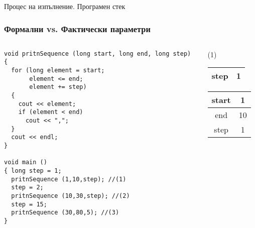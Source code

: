 \documentclass{beamer}
\begin{document}
\begin{frame}
\centerline{Процес на изпълнение. Програмен стек}
\end{frame}


\begin{frame}[fragile]
\frametitle{Формални vs. Фактически параметри}



\begin{columns}[t]
  \begin{column}{0.75\textwidth}

\begin{lstlisting}
void pritnSequence (long start, long end, long step)
{
  for (long element = start;
       element <= end;
       element += step)
  {
    cout << element;
    if (element < end)
      cout << ",";
  }
  cout << endl;
}

void main ()
{ long step = 1;
  pritnSequence (1,10,step); //(1)
  step = 2;
  pritnSequence (10,30,step); //(2)
  step = 15;
  pritnSequence (30,80,5); //(3)
}
\end{lstlisting}


  \end{column}
  \begin{column}{0.25\textwidth}

    \alert{(1)}

    \begin{tabular}{|c|c|}
    step & 1 \\\hline

    \end{tabular}
    \pause
    \begin{tabular}{|c|c|}
    start & 1 \\\hline
    end & 10 \\\hline
    step & 1 \\\hline

    \end{tabular}
  \end{column}
\end{columns}

\end{frame}
\end{document}
